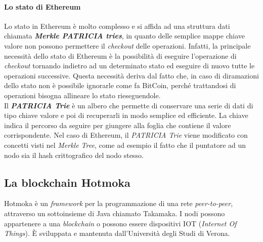 \paragraph{Lo stato di Ethereum}
Lo stato in Ethereum è molto complesso e si affida ad una struttura dati chiamata \textit{\textbf{Merkle PATRICIA tries}}, in quanto delle semplice mappe chiave valore non possono permettere il \textit{checkout} delle operazioni. Infatti, la principale necessità dello stato di Ethereum è la possibilità di eseguire l'operazione di \textit{checkout} tornando indietro ad un determinato stato ed eseguire di nuovo tutte le operazioni successive. Questa necessità deriva dal fatto che, in caso di diramazioni dello stato non è possibile ignorarle come fa BitCoin, perché trattandosi di operazioni bisogna allineare lo stato rieseguendole. \\

Il \textbf{\textit{PATRICIA Trie}} è un albero che permette di conservare una serie di dati di tipo chiave valore e poi di recuperarli in modo semplice ed efficiente. La chiave indica il percorso da seguire per giungere alla foglia che contiene il valore corrispondente. Nel caso di Ethereum, il \textit{PATRICIA Trie} viene modificato con concetti visti nel \textit{Merkle Tree}, come ad esempio il fatto che il puntatore ad un nodo sia il hash crittografico del nodo stesso.


\subsection{La blockchain Hotmoka}
Hotmoka è un \textit{framework} per la programmazione di una rete \textit{peer-to-peer}, attraverso un sottoinsieme di Java chiamato Takamaka. I nodi possono appartenere a una \textit{blockchain} o possono essere dispositivi IOT (\textit{Internet Of Things}). È sviluppata e mantenuta dall'Università degli Studi di Verona.



